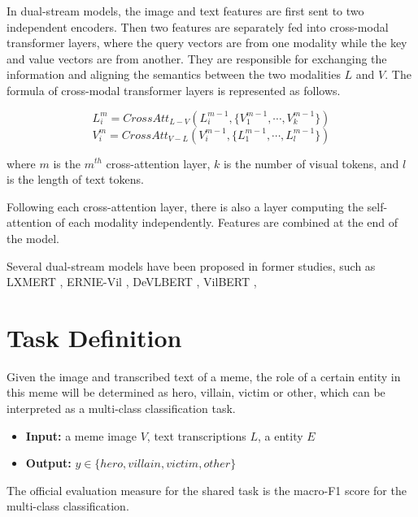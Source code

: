 \documentclass[11pt]{article}
\begin{document}
In dual-stream models, the image and text features are first sent to two independent encoders. Then two features are separately fed into cross-modal transformer layers, where the query vectors are from one modality while the key and value vectors are from another. They are responsible for exchanging the information and aligning the semantics between the two modalities $L$ and $V$. The formula of cross-modal transformer layers is represented as follows.

\begin{small}
\begin{equation}
L^m_i = CrossAtt_{L-V} (L^{m-1}_i,\{ V^{m-1}_1, \cdots, V^{m-1}_k \} )
\end{equation}
\begin{equation}
V^m_i = CrossAtt_{V-L} (V^{m-1}_i,\{ L^{m-1}_1, \cdots, L^{m-1}_l \} )
\end{equation}
\end{small}
where $m$ is the $m^{th}$ cross-attention layer, $k$ is the number of visual tokens, and $l$ is the length of text tokens.

Following each cross-attention layer, there is also a layer computing the self-attention of each modality independently. Features are combined at the end of the model. 

Several dual-stream models have been proposed in former studies, such as LXMERT \citep{tan2019lxmert}, ERNIE-Vil \citep{yu2020ernie}, DeVLBERT \citep{zhang2020devlbert}, VilBERT \citep{lu2019vilbert}, 

\section{Task Definition}

Given the image and transcribed text of a meme, the role of a certain entity in this meme will be determined as hero, villain, victim or other, which can be interpreted as a multi-class classification task.

\begin{itemize}
\item \textbf{Input:} a meme image $V$, text transcriptions $L$, a entity $E$

\item \textbf{Output:} $y \in \{hero, villain, victim, other\}$

\end{itemize}

The official evaluation measure for the shared task is the macro-F1 score for the multi-class classification.
\end{document}
